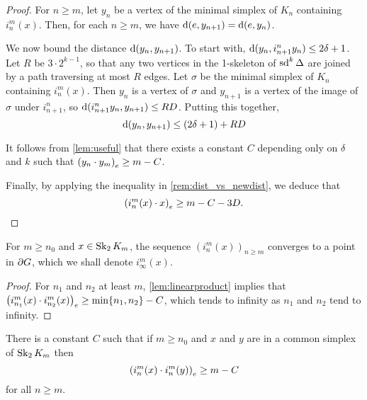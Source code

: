 \documentclass[a4paper]{article}
\begin{document}
\begin{proof}
  For $n \geq m$, let $y_n$ be a vertex of the minimal simplex of $K_n$
  containing $i^m_n(x)$. Then, for each $n \geq m$, we have $\dist(e, y_{n+1})
  = \dist(e, y_n)$. 

  We now bound the distance $\dist(y_n, y_{n+1})$. To start with, $\dist(y_n,
  i^n_{n+1} y_n) \leq 2\delta+1$. Let $R$ be $3\cdot 2^{k-1}$, so that any two
  vertices in the 1-skeleton of $\sd^k \Delta$ are joined by a path
  traversing at most $R$ edges. Let $\sigma$ be the minimal simplex of $K_n$
  containing $i^m_n(x)$. Then $y_n$ is a vertex of $\sigma$ and $y_{n+1}$ is a
  vertex of the image of $\sigma$ under $i^n_{n+1}$, so $\dist(i^n_{n+1} y_n,
  y_{n+1}) \leq RD$.  Putting this together,
  \begin{equation*}
    \dist(y_n, y_{n+1}) \leq (2\delta + 1) + RD
  \end{equation*}

  It follows from \cref{lem:useful} that there exists a constant $C$ depending
  only on $\delta$ and $k$ such that $\gromov{e}{y_n}{y_m} \geq m -
  C$.

  Finally, by applying the inequality in \cref{rem:dist_vs_newdist}, we deduce
  that
  \begin{equation*}
      \gromov{e}{i^m_n(x)}{x} \geq m - C - 3D.\qedhere
  \end{equation*}
\end{proof}

\begin{corollary}
  For $m \geq n_0$ and $x \in \Skel_2 K_m$, the sequence
  $(i^m_n(x))_{n\geq m}$ converges to a point in $\boundary G$, which we shall
  denote $i^m_\infty(x)$.
\end{corollary}

\begin{proof}
  For $n_1$ and $n_2$ at least $m$, \cref{lem:linearproduct} implies that
  $\gromov{e}{i^m_{n_1}(x)}{i^m_{n_2}(x)} \geq \min\{n_1,n_2\} - C$, which
  tends to infinity as $n_1$ and $n_2$ tend to infinity.
\end{proof}

\begin{lemma}\label{lem:simplexproduct}
  There is a constant $C$ such that if $m \geq n_0$ and $x$ and $y$ are in a
  common simplex of $\Skel_2 K_m$ then
  \begin{equation*}
    \gromov{e}{i^m_n(x)}{i^m_n(y)} \geq m - C
  \end{equation*}
  for all $n\geq m$.
\end{lemma}
\end{document}

